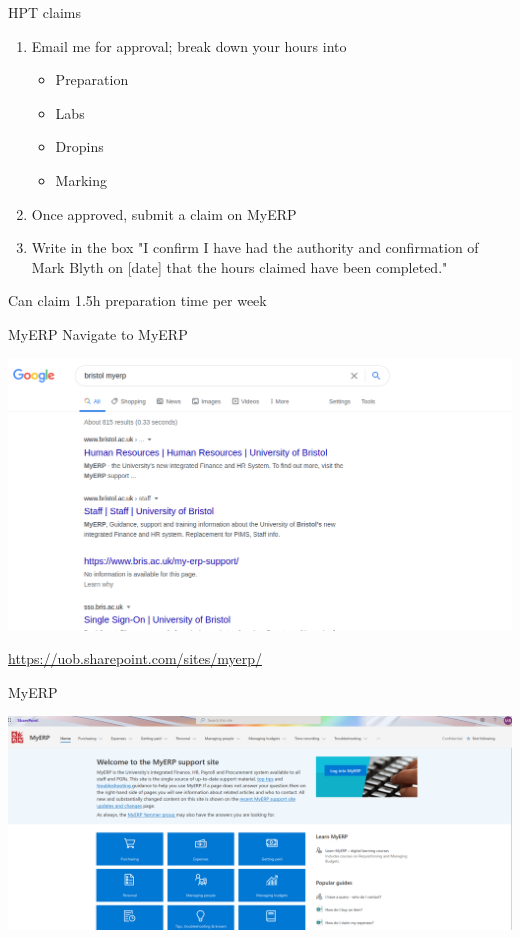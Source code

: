 \documentclass[presentation]{beamer}
\begin{document}
\begin{frame}[label={sec:org7059c3b}]{HPT claims}
\begin{enumerate}
\item Email me for approval; break down your hours into
\begin{itemize}
\item Preparation
\item Labs
\item Dropins
\item Marking
\end{itemize}
\item Once approved, submit a claim on MyERP
\item Write in the box "I confirm I have had the authority and confirmation of Mark Blyth on \alert{[date]} that the hours claimed have been completed."
\end{enumerate}

\vfill
Can claim 1.5h preparation time per week
\end{frame}

\begin{frame}[label={sec:org7081a13},plain]{MyERP}
Navigate to MyERP

\begin{center}
\includegraphics[width=.9\linewidth]{./icp_search.png}
\end{center}

\url{https://uob.sharepoint.com/sites/myerp/}
\end{frame}

\begin{frame}[label={sec:orgbd5f742}]{MyERP}
\begin{center}
\includegraphics[width=.9\linewidth]{./icp_login.png}
\end{center}
\end{frame}
\end{document}
